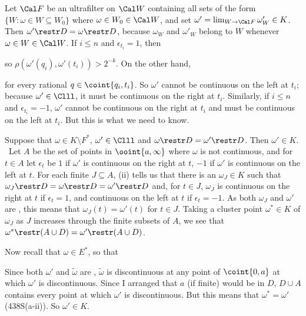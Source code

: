 {Let $\Cal F$ be an ultrafilter on $\Cal W$ containing all sets of the form
$\{W:\omega\in W\subseteq W_0\}$ where $\omega\in W_0\in\Cal W$,
and set $\omega'=\lim_{W\to\Cal F}\omega'_W\in K$.
Then $\omega'\restr D=\omega\restr D$, because $\omega_W$ and $\omega'_W$
belong to $W$ whenever $\omega\in W\in\Cal W$.
If $i\le n$ and $\epsilon_{t_i}=1$, then



\noindent so $\rho(\omega'(q_i),\omega'(t_i))>2^{-k}$.
On the other hand,


\noindent for every rational $q\in\coint{q_i,t_i}$.   So $\omega'$ cannot
be continuous on the left at $t_i$;  because $\omega'\in\Clll$, it
must be continuous on the right at $t_i$.   Similarly, if $i\le n$ and
$\epsilon_{t_i}=-1$, $\omega'$ cannot be continuous on the right at $t_i$
and must be continuous on the left at $t_i$.
But this is what we need to know.\ \Qed

\medskip

 Suppose that $\omega\in K\setminus F^*$,
$\omega'\in\Clll$ and $\omega\restr D=\omega'\restr D$.
Then $\omega'\in K$.   \Prf\ Let $A$ be the set of points in
$\ooint{a,\infty}$ where $\omega$ is
not continuous, and for $t\in A$ let $\epsilon_t$ be $1$ if $\omega'$ is
continuous on the right at $t$, $-1$ if $\omega'$ is continuous on the left
at $t$.   For each finite $J\subseteq A$, (ii) tells us that there is an
$\omega_J\in K$ such that
$\omega_J\restr D=\omega\restr D=\omega'\restr D$ and,
for $t\in J$, $\omega_J$ is continuous on the right at $t$ if
$\epsilon_t=1$, and continuous on the left at $t$ if $\epsilon_t=-1$.
As both $\omega_J$ and $\omega'$ are \callal,
this means that $\omega_J(t)=\omega'(t)$ for $t\in J$.   Taking a
cluster point $\omega^*\in K$ of $\omega_J$ as $J$ increases through the
finite subsets of $A$, we see that
$\omega^*\restr(A\cup D)=\omega'\restr(A\cup D)$.

Now recall that $\omega\in E^*$, so that


\noindent Since both $\omega'$ and $\tilde\omega$ are \callal,
$\tilde\omega$ is discontinuous at any point
of $\coint{0,a}$ at which $\omega'$ is discontinuous.   Since I arranged
that $a$ (if finite) would be in $D$, $D\cup A$ contains every point at
which $\omega'$ is discontinuous.   But this means that $\omega^*=\omega'$
(438S(a-ii)).   So $\omega'\in K$.\ \Qed

}
